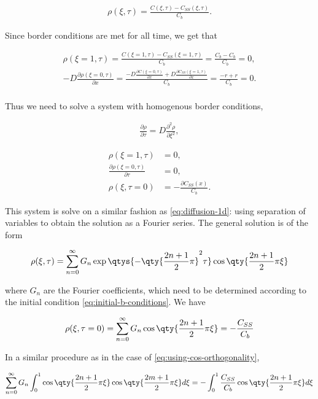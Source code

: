 \begin{align}
	\rho(\xi, \tau) = \frac{C(\xi,\tau)-C_{SS}(\xi, \tau)}{C_b}.
\end{align}

Since border conditions are met for all time, we get that 

\begin{align}
	\rho(\xi = 1, \tau) = \frac{C(\xi=1,\tau)-C_{SS}(\xi=1, \tau)}{C_b} = \frac{C_b - C_b}{C_b} = 0,\\
	-D\frac{\partial \rho(\xi = 0, \tau)}{\partial x} = \frac{-D\frac{\partial C(\xi=0,\tau)}{\partial x}+D\frac{\partial C_{SS}(\xi=1, \tau)}{\partial x}}{C_b} = \frac{-r + r}{C_b}=0.\\
\end{align}


Thus we need to solve a system with homogenous border conditions,

\begin{align}
	\frac{\partial \rho}{\partial \tau} = D\frac{\partial^2 \rho}{\partial \xi^2},
\end{align}

\begin{align}
	\rho(\xi = 1, \tau) &= 0, \\
	\frac{\partial\rho(\xi = 0, \tau)}{\partial \tau} &= 0, \\
	\rho(\xi, \tau = 0) &= -\frac{\partial C_{SS}(x)}{C_b}.
	\label{eq:initial-b-conditions}
\end{align}

This system is solve on a similar fashion as \ref{eq:diffusion-1d}: using separation of variables to obtain the solution as a Fourier series. The general solution is of the form

\begin{align}
	\rho(\xi, \tau) = \sum_{n=0}^{\infty} G_n \exp\qtys{-\qty{\frac{2n+1}{2}\pi}^2\tau}\cos\qty{\frac{2n+1}{2}\pi\xi}
\end{align}

where $G_n$ are the Fourier coefficients, which need to be determined according to the initial condition \ref{eq:initial-b-conditions}. We have

\begin{align}
	\rho(\xi, \tau = 0) = \sum_{n=0}^{\infty} G_n \cos\qty{\frac{2n+1}{2}\pi\xi} = -\frac{C_{SS}}{C_b}
\end{align}

In a similar procedure as in the case of \ref{eq:using-cos-orthogonality},

\begin{align}
	\sum_{n=0}^{\infty} G_n \int_{0}^{1}\cos\qty{\frac{2n+1}{2}\pi\xi}\cos\qty{\frac{2m+1}{2}\pi\xi} d\xi = -\int_0^1 \frac{C_{SS}}{C_b}\cos\qty{\frac{2n+1}{2}\pi\xi} d\xi
\end{align}

